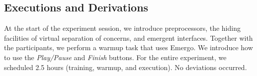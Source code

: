 

\subsection{Executions and Derivations}

At the start of the experiment session, we introduce preprocessors, the hiding facilities of virtual separation of concerns, and emergent interfaces. Together with the participants, we perform a warmup task that uses Emergo. We introduce how to use the \emph{Play/Pause} and \emph{Finish} buttons. For the entire experiment, we scheduled 2.5 hours (training, warmup, and execution). No deviations occurred.


